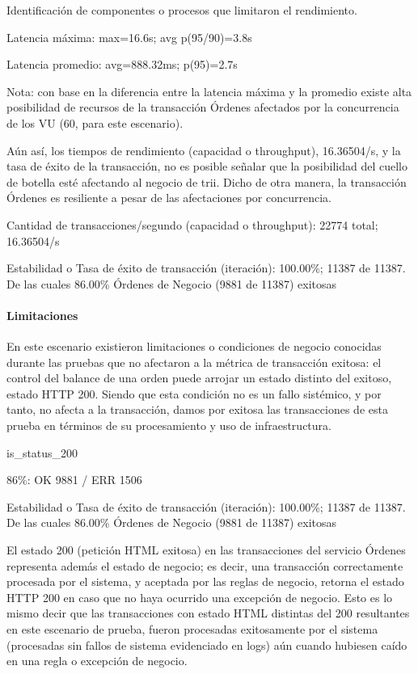 \documentclass[
  paper=a4,
  ,captions=tableheading
]{scrartcl}
\renewenvironment{quote}{\begin{customblockquote}\list{}{\rightmargin=0em\leftmargin=0em}%
\item\relax\color{blockquote-text}\ignorespaces}{\unskip\unskip\endlist\end{customblockquote}}
\begin{document}
Identificación de componentes o procesos que limitaron el rendimiento.

\begin{quote}
Latencia máxima: max=16.6s; avg p(95/90)=3.8s

Latencia promedio: avg=888.32ms; p(95)=2.7s
\end{quote}

Nota: con base en la diferencia entre la latencia máxima y la promedio
existe alta posibilidad de recursos de la transacción Órdenes afectados
por la concurrencia de los VU (60, para este escenario).

Aún así, los tiempos de rendimiento (capacidad o throughput),
16.36504/s, y la tasa de éxito de la transacción, no es posible señalar
que la posibilidad del cuello de botella esté afectando al negocio de
trii. Dicho de otra manera, la transacción Órdenes es resiliente a pesar
de las afectaciones por concurrencia.

\begin{quote}
Cantidad de transacciones/segundo (capacidad o throughput): 22774 total;
16.36504/s

Estabilidad o Tasa de éxito de transacción (iteración): 100.00\%; 11387
de 11387. De las cuales 86.00\% Órdenes de Negocio (9881 de 11387)
exitosas
\end{quote}

\paragraph{Limitaciones}\label{sec:limitaciones-2}

En este escenario existieron limitaciones o condiciones de negocio
conocidas durante las pruebas que no afectaron a la métrica de
transacción exitosa: el control del balance de una orden puede arrojar
un estado distinto del exitoso, estado HTTP 200. Siendo que esta
condición no es un fallo sistémico, y por tanto, no afecta a la
transacción, damos por exitosa las transacciones de esta prueba en
términos de su procesamiento y uso de infraestructura.

\begin{quote}
is\_status\_200

86\%: OK 9881 / ERR 1506

Estabilidad o Tasa de éxito de transacción (iteración): 100.00\%; 11387
de 11387. De las cuales 86.00\% Órdenes de Negocio (9881 de 11387)
exitosas
\end{quote}

El estado 200 (petición HTML exitosa) en las transacciones del servicio
Órdenes representa además el estado de negocio; es decir, una
transacción correctamente procesada por el sistema, y aceptada por las
reglas de negocio, retorna el estado HTTP 200 en caso que no haya
ocurrido una excepción de negocio. Esto es lo mismo decir que las
transacciones con estado HTML distintas del 200 resultantes en este
escenario de prueba, fueron procesadas exitosamente por el sistema
(procesadas sin fallos de sistema evidenciado en logs) aún cuando
hubiesen caído en una regla o excepción de negocio.
\end{document}
